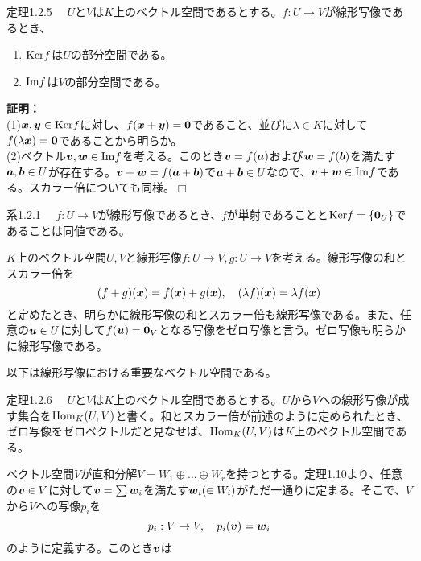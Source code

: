 \documentclass[dvipdfmx, 9pt, a4paper]{jsarticle}
\numberwithin{equation}{subsection}
\newcommand{\bm}[1]{{\mbox{\boldmath $#1$}}}
\def\qed{\hfill $\Box$}
\begin{document}
\begin{itembox}[l]{定理1.2.5}
　$U$と$V$は$K$上のベクトル空間であるとする。$f:U \to V$が線形写像であるとき、
\begin{enumerate}
\item ${\rm Ker}f$は$U$の部分空間である。
\item ${\rm Im}f$は$V$の部分空間である。
\end{enumerate}
\end{itembox}
{\bf 証明：}\\
(1)$\bm x, \bm y \in {\rm Ker}f$に対し、$f(\bm x+\bm y)=\bm 0$であること、並びに$\lambda \in K$に対して$f(\lambda \bm x)=\bm 0$であることから明らか。\\
(2)ベクトル$\bm v, \bm w \in {\rm Im}f$を考える。このとき$\bm v=f(\bm a)$および$\bm w=f(\bm b)$を満たす$\bm a, \bm b \in U$が存在する。$\bm v+\bm w=f(\bm a+\bm b)$で$\bm a+\bm b \in U$なので、$\bm v + \bm w \in {\rm Im}f$である。スカラー倍についても同様。\qed
\begin{itembox}[l]{系1.2.1}
　$f:U \to V$が線形写像であるとき、$f$が単射であることと${\rm Ker}f=\{ \bm 0_U \}$であることは同値である。
\end{itembox}\par
$K$上のベクトル空間$U, V$と線形写像$f:U \to V, g:U \to V$を考える。線形写像の和とスカラー倍を
\begin{equation}
(f+g)(\bm x)=f(\bm x)+g(\bm x),~~~(\lambda f)(\bm x)=\lambda f(\bm x) \notag
\end{equation}
と定めたとき、明らかに線形写像の和とスカラー倍も線形写像である。また、任意の$\bm u \in U$に対して$f(\bm u)=\bm 0_V$となる写像をゼロ写像と言う。ゼロ写像も明らかに線形写像である。\par
以下は線形写像における重要なベクトル空間である。
\begin{itembox}[l]{定理1.2.6}
　$U$と$V$は$K$上のベクトル空間であるとする。$U$から$V$への線形写像が成す集合を${\rm Hom}_K(U, V)$と書く。和とスカラー倍が前述のように定められたとき、ゼロ写像をゼロベクトルだと見なせば、${\rm Hom}_K(U, V)$は$K$上のベクトル空間である。
\end{itembox}\par
ベクトル空間$V$が直和分解$V=W_1 \oplus ... \oplus W_r$を持つとする。定理1.10より、任意の$\bm v \in V$に対して$\bm v=\sum \bm w_i$を満たす$\bm w_i(\in W_i)$がただ一通りに定まる。そこで、$V$から$V$への写像$p_i$を
\begin{equation}
p_i:V \to V, ~~~p_i(\bm v)=\bm w_i \notag
\end{equation}
のように定義する。このとき$\bm v$は
\end{document}
